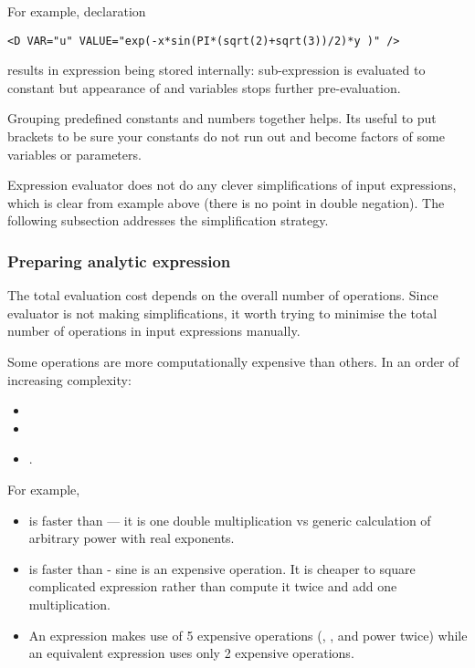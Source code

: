 For example, declaration 
\begin{lstlisting}[style=XMLStyle]
     <D VAR="u" VALUE="exp(-x*sin(PI*(sqrt(2)+sqrt(3))/2)*y )" />
\end{lstlisting}
results in expression  being
stored internally: sub-expression  is
evaluated to constant but appearance of  and  variables
stops further pre-evaluation.

Grouping predefined constants and numbers together helps. Its useful to put
brackets to be sure your constants do not run out and become factors of some
variables or parameters.

Expression evaluator does not do any clever simplifications of input
expressions, which is clear from example above (there is no point in double
negation). The following subsection addresses the simplification strategy.

\subsubsection{Preparing analytic expression}

The total evaluation cost depends on the overall number of operations. Since
evaluator is not making simplifications, it worth trying to minimise the total
number of operations in input expressions manually.

Some operations are more computationally expensive than others. In an order of
increasing complexity:
\begin{itemize}
\item \inlsh{+, -, <, >, <=, >=, ==, }
\item {}
\item {}.
\end{itemize}

For example,
\begin{itemize}
\item {} is faster than  --- it is one double
multiplication vs generic calculation of arbitrary power with real exponents.
\item {} is faster than  -
sine is an expensive operation. It is cheaper to square complicated expression rather than
 compute it twice and add one multiplication.
\item An expression
 makes use of 5 expensive operations (, , 
 and power \inlsh{\^} twice) while an equivalent expression
 uses only 2 expensive operations.
\end{itemize}

